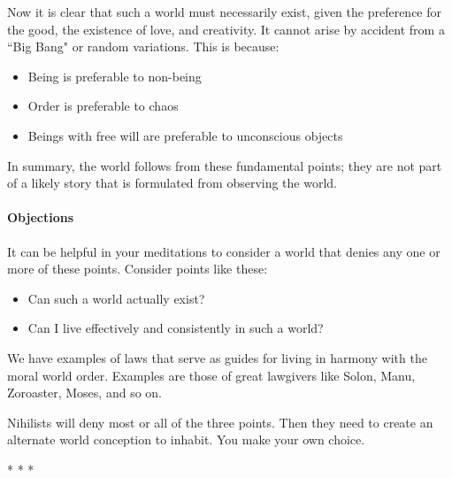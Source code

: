 Now it is clear that such a world must necessarily exist, given the preference for the good, the existence of love, and creativity. It cannot arise by accident from a ``Big Bang" or random variations. This is because:

\begin{itemize}
\item Being is preferable to non-being 
\item Order is preferable to chaos 
\item Beings with free will are preferable to unconscious objects 
\end{itemize}
In summary, the world follows from these fundamental points; they are not part of a likely story that is formulated from observing the world.

\paragraph{Objections}
It can be helpful in your meditations to consider a world that denies any one or more of these points. Consider points like these:

\begin{itemize}
\item Can such a world actually exist? 
\item Can I live effectively and consistently in such a world? 
\end{itemize}
We have examples of laws that serve as guides for living in harmony with the moral world order. Examples are those of great lawgivers like Solon, Manu, Zoroaster, Moses, and so on.

Nihilists will deny most or all of the three points. Then they need to create an alternate world conception to inhabit. You make your own choice.




\begin{center}* * *\end{center}

